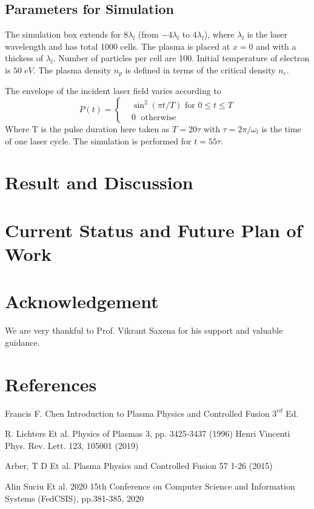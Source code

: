 \documentclass[12pt]{article}
\begin{document}
\subsection{Parameters for Simulation}
The simulation box extends for $8 \lambda _l$ (from $-4 \lambda _l$ to $4 \lambda _l$), where $\lambda_l$ is the laser wavelength and has total 1000 cells. The plasma is placed at $x=0$ and with a thickess of $\lambda_l$. Number of particles per cell are 100. Initial temperature of electron is $50 \; eV$. The plasma density $n_p$ is defined in terms of the critical density $n_c$.

The envelope of the incident laser field varies according to
\begin{equation*}
    P(t)=
    \begin{cases}
         & \sin^2(\pi t/T) \text{ for } 0 \leq t \le T \\
         & 0         \;      \text{ otherwise }
    \end{cases}
\end{equation*}
Where T is the pulse duration here taken as $T=20\tau$ with $\tau = 2\pi/\omega_l$ is the time of one laser cycle. The simulation is performed for $t=55\tau$.
\section{Result and Discussion}
\section{Current Status and Future Plan of Work}

\section{Acknowledgement}
We are very thankful to Prof. Vikrant Saxena for his support and valuable guidance.
\section{References}
\begin{thebibliography}{9}
    Francis F. Chen
    Introduction to Plasma Physics and Controlled Fusion $3^{rd}$ Ed.

    R. Lichters Et al. Physics of Plasmas 3, pp. 3425-3437 (1996)
    Henri Vincenti Phys. Rev. Lett. 123, 105001 (2019)

    Arber, T D Et al. Plasma Physics and Controlled Fusion 57 1-26 (2015)

    Alin Suciu Et al. 2020 15th Conference on Computer Science and Information Systems (FedCSIS), pp.381-385, 2020
\end{thebibliography}
\end{document}
